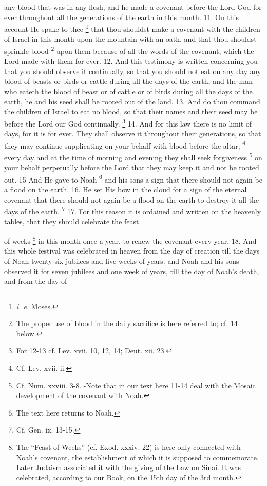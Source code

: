 any blood that was in any flesh, and he made a covenant before the Lord God for ever throughout all the generations of the earth in this month. 11. On this account He spake to thee \footnote{\emph{i. e.} Moses.} that thou shouldst make a covenant with the children of Israel in this month upon the mountain with an oath, and that thou shouldst sprinkle blood \footnote{The proper use of blood in the daily sacrifice is here referred to; cf. 14 below.} upon them because of all the words of the covenant, which the Lord made with them for ever. 12. And this testimony is written concerning you that you should observe it continually, so that you should not eat on any day any blood of beasts or birds or cattle during all the days of the earth, and the man who eateth the blood of beast or of cattle or of birds during all the days of the earth, he and his seed shall be rooted out of the land. 13. And do thou command the children of Israel to eat no blood, so that their names and their seed may be before the Lord our God continually. \footnote{For 12-13 cf. Lev. xvii. 10, 12, 14; Deut. xii. 23.} 14. And for this law there is no limit of days, for it is for ever. They shall observe it throughout their generations, so that they may continue supplicating on your behalf with blood before the altar; \footnote{Cf. Lev. xvii. ii.} every day and at the time of morning and evening they shall seek forgiveness \footnote{Cf. Num. xxviii. 3-8. -Note that in our text here 11-14 deal with the Mosaic development of the covenant with Noah.} on your behalf perpetually before the Lord that they may keep it and not be rooted out. 15 And He gave to Noah \footnote{The text here returns to Noah.} and his sons a sign that there should not again be a flood on the earth. 16. He set His bow in the cloud for a sign of the eternal covenant that there should not again be a flood on the earth to destroy it all the days of the earth. \footnote{Cf. Gen. ix. 13-15.} 17. For this reason it is ordained and written on the heavenly tables, that they should celebrate the feast

of weeks \footnote{The ``Feast of Weeks'' (cf. Exod. xxxiv. 22) is here only connected with Noah's covenant, the establishment of which it is supposed to commemorate. Later Judaism associated it with the giving of the Law on Sinai. It was celebrated, according to our Book, on the 15th day of the 3rd month.} in this month once a year, to renew the covenant every year. 18. And this whole festival was celebrated in heaven from the day of creation till the days of Noah-twenty-six jubilees and five weeks of years: and Noah and his sons observed it for seven jubilees and one week of years, till the day of Noah's death, and from the day of


